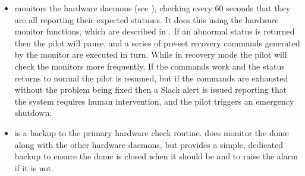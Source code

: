 \begin{colsection}
\begin{itemize}
\item {} monitors the hardware daemons (see ), checking every 60 seconds that they are all reporting their expected statuses. It does this using the hardware monitor functions, which are described in . If an abnormal status is returned then the pilot will pause, and a series of pre-set recovery commands generated by the monitor are executed in turn. While in recovery mode the pilot will check the monitors more frequently. If the commands work and the status returns to normal the pilot is resumed, but if the commands are exhausted without the problem being fixed then a Slack alert is issued reporting that the system requires human intervention, and the pilot triggers an emergency shutdown.

\item {} is a backup to the primary hardware check routine.  does monitor the dome along with the other hardware daemons, but  provides a simple, dedicated backup to ensure the dome is closed when it should be and to raise the alarm if it is not.

\end{itemize}

\newpage

\end{colsection}



